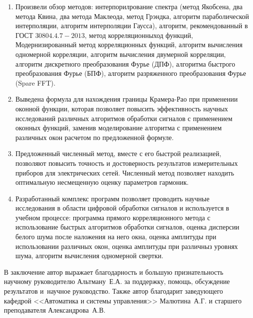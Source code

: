 \begin{enumerate}
  \item Произвели обзор методов: интерпорилрование спектра (метод Якобсена, два метода Квина, два метода Маклеода, метод Грэндка, алгоритм параболической интерполяции, алгоритм интерполяции Гаусса), алгоритм, рекомендованный в ГОСТ $30804.4.7-2013$, метод корреляционныход  функций, Модернизированный метод корреляционных функций, алгоритм вычисления одномерной корреляции, алгоритм вычисления двумерной корреляции, алгоритм дискретного преобразования Фурье (ДПФ), алгоритма быстрого преобразования Фурье (БПФ), алгоритм разряженного преобразования Фурье (Spare FFT). 
  \item Выведена формула для нахождения границы Крамера-Рао при применении оконной функции, которая позволяет повысить эффективность научных исследований различных алгоритмов обработки сигналов с применением оконных функций, заменив моделирование алгоритма с применением различных окон расчетом по предложенной формуле.
  \item Предложенный численный метод, вместе с его быстрой реализацией, позволяют повысить точность и достоверность результатов измерительных приборов для электрических сетей. Численный метод позволяет находить оптимальную несмещенную оценку параметров гармоник.
  \item Разработанный комплекс программ позволяет проводить научные исследования в области цифровой обработки сигналов и используется в учебном процессе: программа прямого корреляционного метода с использование быстрых алгоритмов обработки сигналов, оценка дисперсии белого шума после наложения на него окна, оценка амплитуды при использовании различных окон, оценка амплитуды при различныз уровнях шума, алгоритм вычисления одномерной свертки.
\end{enumerate}

В заключение автор выражает благодарность и большую признательность научному руководителю Альтману~Е.\:А. за поддержку, помощь, обсуждение результатов и~научное руководство. Также автор благодарит заведующего кафедрой <<Автоматика и системы управления>> Малютина~А.\:Г. и старшего преподавателя Александрова~А.\:В.